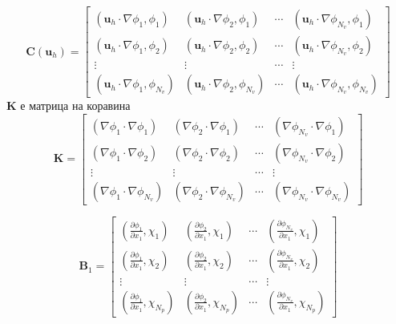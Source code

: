 \documentclass[12pt]{report}
\begin{document}
\begin{equation*}
	\mathbf{C}(\mathbf{u}_h) = \begin{bmatrix}
		\left(\mathbf{u}_h\cdot\nabla\phi_1, \phi_1\right) & \left(\mathbf{u}_h\cdot\nabla\phi_2, \phi_1\right) & \cdots & \left(\mathbf{u}_h\cdot\nabla\phi_{N_v}, \phi_1\right)\\
		\left(\mathbf{u}_h\cdot\nabla\phi_1, \phi_2\right) & \left(\mathbf{u}_h\cdot\nabla\phi_2, \phi_2\right) & \cdots & \left(\mathbf{u}_h\cdot\nabla\phi_{N_v}, \phi_2\right)\\
		\vdots & \vdots & \cdots & \vdots \\
		\left(\mathbf{u}_h\cdot\nabla\phi_1, \phi_{N_v}\right) & \left(\mathbf{u}_h\cdot\nabla\phi_2, \phi_{N_v}\right) & \cdots & \left(\mathbf{u}_h\cdot\nabla\phi_{N_v}, \phi_{N_v}\right)
	\end{bmatrix}
\end{equation*}
$\mathbf{K}$ е матрица на коравина
\begin{equation*}
	\mathbf{K} = \begin{bmatrix}
		\left(\nabla\phi_1\cdot\nabla\phi_1\right) & \left(\nabla\phi_2\cdot\nabla\phi_1\right) &
		\cdots &
		\left(\nabla\phi_{N_v}\cdot\nabla\phi_1\right) \\
		\left(\nabla\phi_1\cdot\nabla\phi_2\right) & \left(\nabla\phi_2\cdot\nabla\phi_2\right) &
		\cdots &
		\left(\nabla\phi_{N_v}\cdot\nabla\phi_2\right) \\
		\vdots & \vdots & \cdots & \vdots \\
		\left(\nabla\phi_1\cdot\nabla\phi_{N_v}\right) & \left(\nabla\phi_2\cdot\nabla\phi_{N_v}\right) &
		\cdots &
		\left(\nabla\phi_{N_v}\cdot\nabla\phi_{N_v}\right)
	\end{bmatrix}
\end{equation*}

\begin{equation*}
	\mathbf{B}_1 = \begin{bmatrix}
		\left(\frac{\partial\phi_1}{\partial x_1}, \chi_1\right) & \left(\frac{\partial\phi_2}{\partial x_1}, \chi_1\right) & \cdots & \left(\frac{\partial\phi_{N_v}}{\partial x_1}, \chi_1\right) \\
		\left(\frac{\partial\phi_1}{\partial x_1}, \chi_2\right) & \left(\frac{\partial\phi_2}{\partial x_1}, \chi_2\right) & \cdots & \left(\frac{\partial\phi_{N_v}}{\partial x_1}, \chi_2\right) \\
		\vdots & \vdots & \cdots & \vdots \\
		\left(\frac{\partial\phi_1}{\partial x_1}, \chi_{N_p}\right) & \left(\frac{\partial\phi_2}{\partial x_1}, \chi_{N_p}\right) & \cdots & \left(\frac{\partial\phi_{N_v}}{\partial x_1}, \chi_{N_p}\right)
	\end{bmatrix}
\end{equation*}
\end{document}
